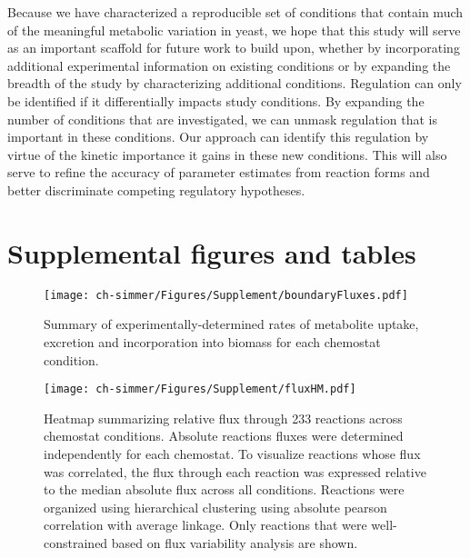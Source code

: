 Because we have characterized a reproducible set of conditions that contain much of the meaningful metabolic variation in yeast, we hope that this study will serve as an important scaffold for future work to build upon, whether by incorporating additional experimental information on existing conditions or by expanding the breadth of the study by characterizing additional conditions. Regulation can only be identified if it differentially impacts study conditions. By expanding the number of conditions that are investigated, we can unmask regulation that is important in these conditions. Our approach can identify this regulation by virtue of the kinetic importance it gains in these new conditions. This will also serve to refine the accuracy of parameter estimates from reaction forms and better discriminate  competing regulatory hypotheses.

\section{Supplemental figures and tables}

\setcounter{figure}{0}
\makeatletter 
\renewcommand{\thefigure}{\thechapter.S\@arabic\c@figure}
\renewcommand{\thetable}{\thechapter.S\@arabic\c@table}
\renewcommand{\theequation}{\thechapter.S\@arabic\c@equation}
\makeatother



\begin{figure}[H]
\texttt{[image: ch-simmer/Figures/Supplement/boundaryFluxes.pdf]}
\caption[Summary of experimentally-determined rates of metabolite uptake, excretion and incorporation into biomass for each chemostat condition]{Summary of experimentally-determined rates of metabolite uptake, excretion and incorporation into biomass for each chemostat condition.}
\label{fig:boundFlux}
\end{figure}

\begin{figure}[H]
\texttt{[image: ch-simmer/Figures/Supplement/fluxHM.pdf]}
\caption[Heatmap summarizing relative flux through 233 reactions across chemostat conditions]{Heatmap summarizing relative flux through 233 reactions across chemostat conditions.  Absolute reactions fluxes were determined independently for each chemostat. To visualize reactions whose flux was correlated, the flux through each reaction was expressed relative to the median absolute flux across all conditions.  Reactions were organized using hierarchical clustering using absolute pearson correlation with average linkage.  Only reactions that were well-constrained based on flux variability analysis are shown.}
\label{fig:fluxHM}
\end{figure}

